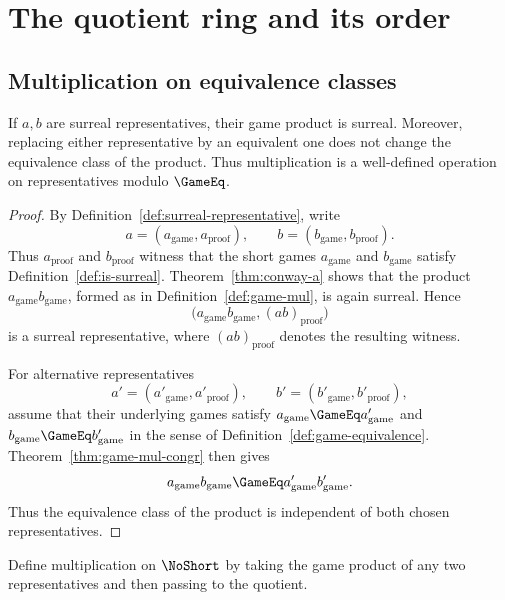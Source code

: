 \chapter{The quotient ring and its order}

\section{Multiplication on equivalence classes}

\begin{theorem}
  \label{thm:surreal-mul}
  \leanok
  If \(a,b\) are surreal representatives, their game product is surreal.  Moreover, replacing
  either representative by an equivalent one does not change the equivalence class of the
  product.  Thus multiplication is a well-defined operation on representatives modulo
  \(\GameEq\).
\end{theorem}
\begin{proof}
  \leanok
  By Definition~\ref{def:surreal-representative}, write
  \[
    a=(a_{\mathrm{game}},a_{\mathrm{proof}}),\qquad
    b=(b_{\mathrm{game}},b_{\mathrm{proof}}).
  \]
  Thus \(a_{\mathrm{proof}}\) and \(b_{\mathrm{proof}}\) witness that the short
  games \(a_{\mathrm{game}}\) and \(b_{\mathrm{game}}\) satisfy
  Definition~\ref{def:is-surreal}.  Theorem~\ref{thm:conway-a} shows that the
  product \(a_{\mathrm{game}}b_{\mathrm{game}}\), formed as in
  Definition~\ref{def:game-mul}, is again surreal.  Hence
  \[
    \bigl(a_{\mathrm{game}}b_{\mathrm{game}},(ab)_{\mathrm{proof}}\bigr)
  \]
  is a surreal representative, where \((ab)_{\mathrm{proof}}\) denotes the
  resulting witness.

  For alternative representatives
  \[
    a'=(a'_{\mathrm{game}},a'_{\mathrm{proof}}),\qquad
    b'=(b'_{\mathrm{game}},b'_{\mathrm{proof}}),
  \]
  assume that their underlying games satisfy
  \(a_{\mathrm{game}}\GameEq a'_{\mathrm{game}}\) and
  \(b_{\mathrm{game}}\GameEq b'_{\mathrm{game}}\) in the sense of
  Definition~\ref{def:game-equivalence}.  Theorem~\ref{thm:game-mul-congr}
  then gives
  \[
    a_{\mathrm{game}}b_{\mathrm{game}}
      \GameEq
    a'_{\mathrm{game}}b'_{\mathrm{game}}.
  \]
  Thus the equivalence class of the product is independent of both chosen
  representatives.
\end{proof}
\begin{definition}
  \label{def:surreal-number-mul}
  \leanok
  Define multiplication on \(\NoShort\) by taking the game product of any two representatives
  and then passing to the quotient.
\end{definition}

